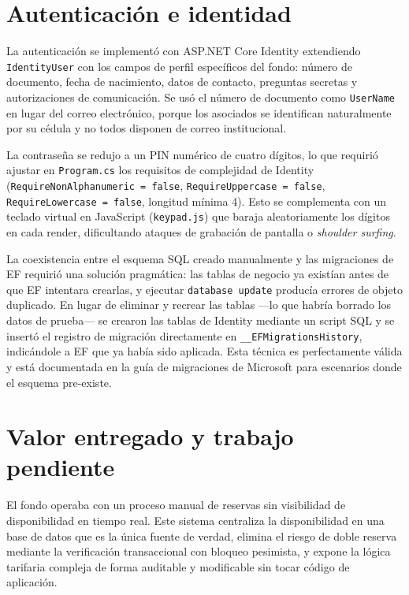\documentclass[12pt, letterpaper]{article}
\begin{document}
\section{Autenticación e identidad}

La autenticación se implementó con ASP.NET Core Identity extendiendo \texttt{IdentityUser} con los campos de perfil específicos del fondo: número de documento, fecha de nacimiento, datos de contacto, preguntas secretas y autorizaciones de comunicación. Se usó el número de documento como \texttt{UserName} en lugar del correo electrónico, porque los asociados se identifican naturalmente por su cédula y no todos disponen de correo institucional.

La contraseña se redujo a un PIN numérico de cuatro dígitos, lo que requirió ajustar en \texttt{Program.cs} los requisitos de complejidad de Identity (\texttt{RequireNonAlphanumeric = false}, \texttt{RequireUppercase = false}, \texttt{RequireLowercase = false}, longitud mínima 4). Esto se complementa con un teclado virtual en JavaScript (\texttt{keypad.js}) que baraja aleatoriamente los dígitos en cada render, dificultando ataques de grabación de pantalla o \emph{shoulder surfing}.

La coexistencia entre el esquema SQL creado manualmente y las migraciones de EF requirió una solución pragmática: las tablas de negocio ya existían antes de que EF intentara crearlas, y ejecutar \texttt{database update} producía errores de objeto duplicado. En lugar de eliminar y recrear las tablas ---lo que habría borrado los datos de prueba--- se crearon las tablas de Identity mediante un script SQL y se insertó el registro de migración directamente en \texttt{\_\_EFMigrationsHistory}, indicándole a EF que ya había sido aplicada. Esta técnica es perfectamente válida y está documentada en la guía de migraciones de Microsoft para escenarios donde el esquema pre-existe.

\section{Valor entregado y trabajo pendiente}

El fondo operaba con un proceso manual de reservas sin visibilidad de disponibilidad en tiempo real. Este sistema centraliza la disponibilidad en una base de datos que es la única fuente de verdad, elimina el riesgo de doble reserva mediante la verificación transaccional con bloqueo pesimista, y expone la lógica tarifaria compleja de forma auditable y modificable sin tocar código de aplicación.
\end{document}
